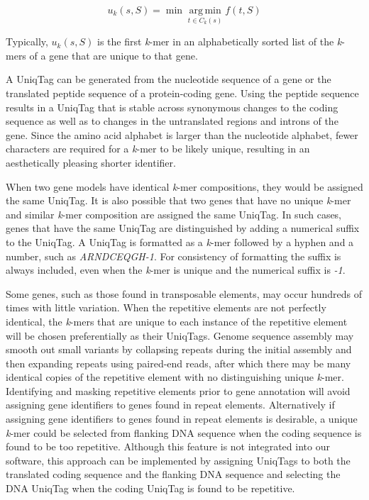 \documentclass[10pt]{article}
\begin{document}
\[
u_k(s, S) = \min \mathop{\arg\,\min}\limits_{t \in C_k(s)} f(t, S)
\]

Typically, \(u_k(s, S)\) is the first \emph{k}-mer in an alphabetically
sorted list of the \emph{k}-mers of a gene that are unique to that gene.

A UniqTag can be generated from the nucleotide sequence of a gene or the
translated peptide sequence of a protein-coding gene. Using the peptide
sequence results in a UniqTag that is stable across synonymous changes
to the coding sequence as well as to changes in the untranslated regions
and introns of the gene. Since the amino acid alphabet is larger than
the nucleotide alphabet, fewer characters are required for a
\emph{k}-mer to be likely unique, resulting in an aesthetically pleasing
shorter identifier.

When two gene models have identical \emph{k}-mer compositions, they
would be assigned the same UniqTag. It is also possible that two genes
that have no unique \emph{k}-mer and similar \emph{k}-mer composition
are assigned the same UniqTag. In such cases, genes that have the same
UniqTag are distinguished by adding a numerical suffix to the UniqTag. A
UniqTag is formatted as a \emph{k}-mer followed by a hyphen and a
number, such as \emph{ARNDCEQGH-1}. For consistency of formatting the
suffix is always included, even when the \emph{k}-mer is unique and the
numerical suffix is \emph{-1}.

Some genes, such as those found in transposable elements, may occur
hundreds of times with little variation. When the repetitive elements
are not perfectly identical, the \emph{k}-mers that are unique to each
instance of the repetitive element will be chosen preferentially as
their UniqTags. Genome sequence assembly may smooth out small variants
by collapsing repeats during the initial assembly and then expanding
repeats using paired-end reads, after which there may be many identical
copies of the repetitive element with no distinguishing unique
\emph{k}-mer. Identifying and masking repetitive elements prior to gene
annotation will avoid assigning gene identifiers to genes found in
repeat elements. Alternatively if assigning gene identifiers to genes
found in repeat elements is desirable, a unique \emph{k}-mer could be
selected from flanking DNA sequence when the coding sequence is found to
be too repetitive. Although this feature is not integrated into our
software, this approach can be implemented by assigning UniqTags to both
the translated coding sequence and the flanking DNA sequence and
selecting the DNA UniqTag when the coding UniqTag is found to be
repetitive.
\end{document}
